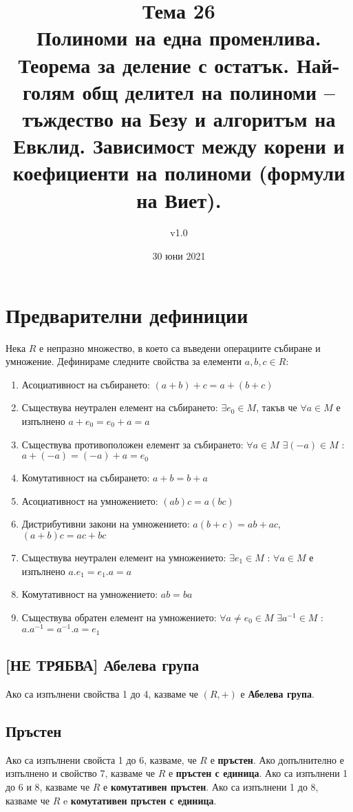 \documentclass[fleqn,12pt]{article}
\title{Тема 26\\Полиноми на една променлива. Теорема за деление с остатък. Най-голям
общ делител на полиноми – тъждество на Безу и алгоритъм на Евклид.
Зависимост между корени и коефициенти на полиноми (формули на Виет).}
\author{v1.0}
\date{30 юни 2021}
\begin{document}
\maketitle

\tableofcontents

\section{Предварителни дефиниции}
Нека $R$ е непразно множество, в което са въведени операциите събиране и умножение.
Дефинираме следните свойства за елементи $a,b,c \in R$:
\begin{enumerate}
    \item \label{prop:add_assoc} Асоциативност на събирането: $(a + b) + c = a + (b + c)$
    \item \label{prop:add_neutral} Съществува неутрален елемент на събирането: $\exists e_0 \in M$, такъв че $\forall a \in M$ е изпълнено $a + e_0 = e_0 + a = a$
    \item \label{prop:add_inverse} Съществува противоположен елемент за събирането: $\forall a \in M$ $\exists (-a) \in M$ : $a + (-a) = (-a) + a = e_0$
    \item \label{prop:add_commute} Комутативност на събирането: $a + b = b + a$
    \item \label{prop:mul_assoc} Асоциативност на умножението: $(ab)c = a(bc)$
    \item \label{prop:mul_distr} Дистрибутивни закони на умножението: $a(b + c) = ab + ac$, $(a + b)c = ac + bc$
    \item \label{prop:mul_neutral} Съществува неутрален елемент на умножението: $\exists e_1 \in M$ : $\forall a \in M$ е изпълнено $a . e_1 = e_1 . a = a$
    \item \label{prop:mul_commute} Комутативност на умножението: $ab = ba$
    \item \label{prop:mul_inverse} Съществува обратен елемент на умножението: $\forall a \neq e_0 \in M$ $\exists a^{-1} \in M$ : $a . a^{-1} = a^{-1} . a = e_1$
\end{enumerate}

\subsection{[НЕ ТРЯБВА] Абелева група}
Ако са изпълнени свойства 1 до 4, казваме че $(R, +)$ е \textbf{Абелева група}.

\subsection{Пръстен}
Ако са изпълнени свойста 1 до 6, казваме, че $R$ е \textbf{пръстен}.
Ако допълнително е изпълнено и свойство 7, казваме че $R$ е \textbf{пръстен с единица}.
Ако са изпълнени 1 до 6 и 8, казваме че $R$ е \textbf{комутативен пръстен}.
Ако са изпълнени 1 до 8, казваме че $R$ e \textbf{комутативен пръстен с единица}.
\end{document}

